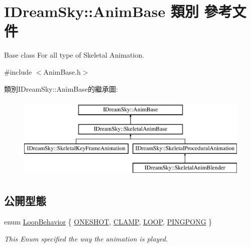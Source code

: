 \hypertarget{class_i_dream_sky_1_1_anim_base}{}\section{I\+Dream\+Sky\+:\+:Anim\+Base 類別 參考文件}
\label{class_i_dream_sky_1_1_anim_base}


Base class For all type of Skeletal Animation.  




{\ttfamily \#include $<$Anim\+Base.\+h$>$}

類別\+I\+Dream\+Sky\+:\+:Anim\+Base的繼承圖\+:\begin{figure}[H]
\begin{center}
\leavevmode
\includegraphics[height=4.000000cm]{class_i_dream_sky_1_1_anim_base}
\end{center}
\end{figure}
\subsection*{公開型態}
\begin{DoxyCompactItemize}
\item 
enum \hyperlink{class_i_dream_sky_1_1_anim_base_aac1c8b7253df068cf02101dcd4f586e2}{Loop\+Behavior} \{ \hyperlink{class_i_dream_sky_1_1_anim_base_aac1c8b7253df068cf02101dcd4f586e2ab593907928f506725c7755d12309a0fc}{O\+N\+E\+S\+H\+OT}, 
\hyperlink{class_i_dream_sky_1_1_anim_base_aac1c8b7253df068cf02101dcd4f586e2a0bebb7e7dc3ea84be147cecde2597317}{C\+L\+A\+MP}, 
\hyperlink{class_i_dream_sky_1_1_anim_base_aac1c8b7253df068cf02101dcd4f586e2aa119a43717e821f2708795bd94021ea1}{L\+O\+OP}, 
\hyperlink{class_i_dream_sky_1_1_anim_base_aac1c8b7253df068cf02101dcd4f586e2ad7ea1dbf56cf6dff883c682250b73208}{P\+I\+N\+G\+P\+O\+NG}
 \}\begin{DoxyCompactList}\small\item\em This Enum specified the way the animation is played. \end{DoxyCompactList}
\end{DoxyCompactItemize}
